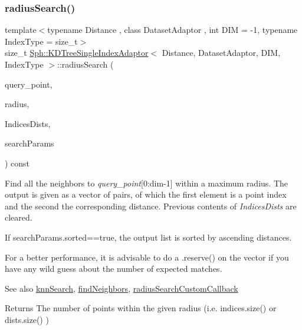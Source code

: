 \subsubsection{\texorpdfstring{radius\+Search()}{radiusSearch()}}
{\footnotesize\ttfamily template$<$typename Distance , class Dataset\+Adaptor , int D\+IM = -\/1, typename Index\+Type  = size\+\_\+t$>$ \\
size\+\_\+t \hyperlink{classSph_1_1KDTreeSingleIndexAdaptor}{Sph\+::\+K\+D\+Tree\+Single\+Index\+Adaptor}$<$ Distance, Dataset\+Adaptor, D\+IM, Index\+Type $>$\+::radius\+Search (\begin{DoxyParamCaption}\item[{const \hyperlink{classBasicVector}{Vector} \&}]{query\+\_\+point,  }\item[{const Distance\+Type \&}]{radius,  }\item[{\hyperlink{classArray}{Array}$<$ \hyperlink{structNeighbourRecord}{Neighbour\+Record} $>$ \&}]{Indices\+Dists,  }\item[{const \hyperlink{structSph_1_1SearchParams}{Search\+Params} \&}]{search\+Params }\end{DoxyParamCaption}) const\hspace{0.3cm}{\ttfamily [inline]}}

Find all the neighbors to {\itshape query\+\_\+point}\mbox{[}0\+:dim-\/1\mbox{]} within a maximum radius. The output is given as a vector of pairs, of which the first element is a point index and the second the corresponding distance. Previous contents of {\itshape Indices\+Dists} are cleared.

If search\+Params.\+sorted==true, the output list is sorted by ascending distances.

For a better performance, it is advisable to do a .reserve() on the vector if you have any wild guess about the number of expected matches.

\begin{DoxySeeAlso}{See also}
\hyperlink{classSph_1_1KDTreeSingleIndexAdaptor_ab2712a5eafbf9344143d2eadff15e802}{knn\+Search}, \hyperlink{classSph_1_1KDTreeSingleIndexAdaptor_a444955d9248884e7fcb1fb238c3b0105}{find\+Neighbors}, \hyperlink{classSph_1_1KDTreeSingleIndexAdaptor_a536e60a78161542b81631f661635e7c5}{radius\+Search\+Custom\+Callback} 
\end{DoxySeeAlso}
\begin{DoxyReturn}{Returns}
The number of points within the given radius (i.\+e. indices.\+size() or dists.\+size() ) 
\end{DoxyReturn}
\hypertarget{classSph_1_1KDTreeSingleIndexAdaptor_a536e60a78161542b81631f661635e7c5}{}\label{classSph_1_1KDTreeSingleIndexAdaptor_a536e60a78161542b81631f661635e7c5} 
